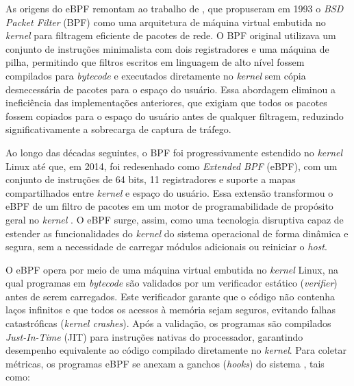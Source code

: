As origens do eBPF remontam ao trabalho de , que propuseram em 1993 o \textit{BSD Packet Filter} (BPF) como uma arquitetura de máquina virtual embutida no \textit{kernel} para filtragem eficiente de pacotes de rede. O BPF original utilizava um conjunto de instruções minimalista com dois registradores e uma máquina de pilha, permitindo que filtros escritos em linguagem de alto nível fossem compilados para \textit{bytecode} e executados diretamente no \textit{kernel} sem cópia desnecessária de pacotes para o espaço do usuário. Essa abordagem eliminou a ineficiência das implementações anteriores, que exigiam que todos os pacotes fossem copiados para o espaço do usuário antes de qualquer filtragem, reduzindo significativamente a sobrecarga de captura de tráfego.

Ao longo das décadas seguintes, o BPF foi progressivamente estendido no \textit{kernel} Linux até que, em 2014, foi redesenhado como \textit{Extended BPF} (eBPF), com um conjunto de instruções de 64 bits, 11 registradores e suporte a mapas compartilhados entre \textit{kernel} e espaço do usuário. Essa extensão transformou o eBPF de um filtro de pacotes em um motor de programabilidade de propósito geral no \textit{kernel} \cite{gregg_bpf_2019, 10.1109/NOMS47738.2020.9110434}. O eBPF surge, assim, como uma tecnologia disruptiva capaz de estender as funcionalidades do \textit{kernel} do sistema operacional de forma dinâmica e segura, sem a necessidade de carregar módulos adicionais ou reiniciar o \textit{host}.

O eBPF opera por meio de uma máquina virtual embutida no \textit{kernel} Linux, na qual programas em \textit{bytecode} são validados por um verificador estático (\textit{verifier}) antes de serem carregados. Este verificador garante que o código não contenha laços infinitos e que todos os acessos à memória sejam seguros, evitando falhas catastróficas (\textit{kernel crashes}). Após a validação, os programas são compilados \textit{Just-In-Time} (JIT) para instruções nativas do processador, garantindo desempenho equivalente ao código compilado diretamente no \textit{kernel}. Para coletar métricas, os programas eBPF se anexam a ganchos (\textit{hooks}) do sistema \cite{gregg_bpf_2019, 10.1109/NOMS47738.2020.9110434, mizinski2025impact}, tais como:

